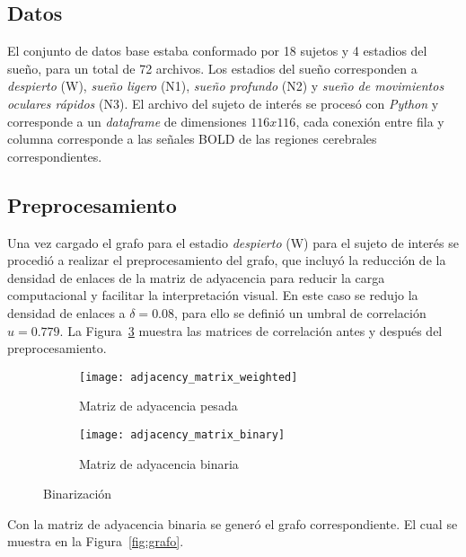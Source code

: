 \documentclass{article}
\begin{document}
\subsection{Datos}\label{subsec:datos}

El conjunto de datos base estaba conformado por 18 sujetos y 4 estadios del sueño, para un total de 72 archivos.
Los estadios del sueño corresponden a \textit{despierto} (W), \textit{sueño ligero} (N1), \textit{sueño profundo} (N2) y \textit{sueño de movimientos oculares rápidos} (N3).
El archivo del sujeto de interés se procesó con \textit{Python} y corresponde a un \textit{dataframe} de dimensiones $116x116$, cada conexión entre fila y columna corresponde a las señales BOLD de las regiones cerebrales correspondientes.

\subsection{Preprocesamiento}\label{subsec:preprocesamiento}

Una vez cargado el grafo para el estadio \textit{despierto} (W) para el sujeto de interés se procedió a realizar el preprocesamiento del grafo, que incluyó la reducción de la densidad de enlaces de la matriz de adyacencia para reducir la carga computacional y facilitar la interpretación visual.
En este caso se redujo la densidad de enlaces a $\delta = 0.08$, para ello se definió un umbral de correlación $u=0.779$.
La Figura~\ref{fig:binarizacion} muestra las matrices de correlación antes y después del preprocesamiento.

\begin{figure}[h!]
  \centering
  \begin{subfigure}[H]{0.25\textwidth}
    \centering
    \texttt{[image: adjacency\_matrix\_weighted]}
    \caption{Matriz de adyacencia pesada}
    \label{fig:adjacency_matrix_weighted}
  \end{subfigure}
  \begin{subfigure}[H]{0.25\textwidth}
      \centering
      \texttt{[image: adjacency\_matrix\_binary]}
      \caption{Matriz de adyacencia binaria}
      \label{fig:adjacency_matrix_binary}
  \end{subfigure}
  \caption{Binarización}
  \label{fig:binarizacion}
\end{figure}

Con la matriz de adyacencia binaria se generó el grafo correspondiente.
El cual se muestra en la Figura~\ref{fig:grafo}.
\end{document}
